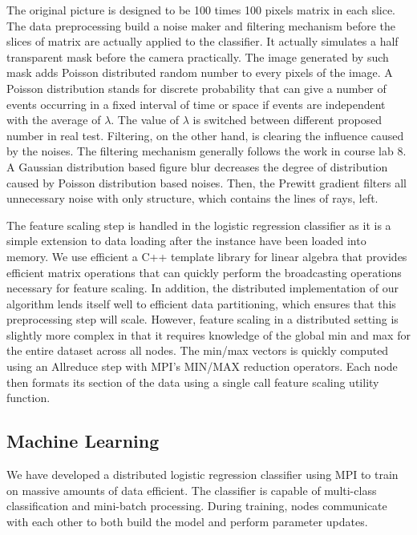 The original picture is designed to be 100 times 100 pixels matrix in each slice. The data preprocessing build a noise maker and filtering mechanism before the slices of matrix are actually applied to the classifier. It actually simulates a half transparent mask before the camera practically. The image generated by such mask adds Poisson distributed random number to every pixels of the image. A Poisson distribution stands for discrete probability that can give a number of events occurring in a fixed interval of time or space if events are independent with the average of $\lambda$. The value of $\lambda$ is switched between different proposed number in real test. Filtering, on the other hand, is clearing the influence caused by the noises. The filtering mechanism generally follows the work in course lab 8. A Gaussian distribution based figure blur decreases the degree of distribution caused by Poisson distribution based noises. Then, the Prewitt gradient filters all unnecessary noise with only structure, which contains the lines of rays, left.

The feature scaling step is handled in the logistic regression classifier as it is a simple extension to data loading after the instance have been loaded into memory.  We use efficient a C++ template library for linear algebra \cite{Eigen} that provides efficient matrix operations that can quickly perform the broadcasting operations necessary for feature scaling.  In addition, the distributed implementation of our algorithm lends itself well to efficient data partitioning, which ensures that this preprocessing step will scale.  However, feature scaling in a distributed setting is slightly more complex in that it requires knowledge of the global min and max for the entire dataset across all nodes.  The min/max vectors is quickly computed using an Allreduce step with MPI's MIN/MAX reduction operators. Each node then formats its section of the data using a single call feature scaling utility function.

\subsection{Machine Learning}
We have developed a distributed logistic regression classifier using MPI to train on massive amounts of data efficient.  The classifier is capable of multi-class classification and mini-batch processing.  During training, nodes communicate with each other to both build the model and perform parameter updates.

